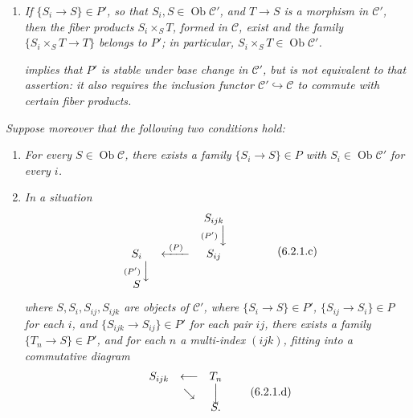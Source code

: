 \begin{enumerate}
  \item[(a)] \textit{If \(\{S_i\to S\}\in P'\), so that
    \(S_i,S\in\operatorname{Ob}\mathscr C'\), and \(T\to S\) is a
    morphism in \(\mathscr C'\), then the fiber products
    \(S_i\times_ST\), formed in \(\mathscr C\), exist and the family
    \(\{S_i\times_ST\to T\}\) belongs to \(P'\); in particular,
    \(S_i\times_ST\in\operatorname{Ob}\mathscr C'\).}

    \textit{ implies that \(P'\) is stable under base change
    in \(\mathscr C'\), but is not equivalent to that assertion: it also
    requires the inclusion functor \(\mathscr C'\hookrightarrow\mathscr C\)
    to commute with certain fiber products.}
\end{enumerate}

\textit{Suppose moreover that the following two conditions hold:}

\begin{enumerate}
  \item[(b)] \textit{For every \(S\in\operatorname{Ob}\mathscr C\), there
    exists a family \(\{S_i\to S\}\in P\) with
    \(S_i\in\operatorname{Ob}\mathscr C'\) for every \(i\).}

  \item[(c)] \textit{In a situation}
    \[
    \begin{array}{ccccc}
      & & S_{ijk} & &\\
      & & \scriptstyle(P')\,\Big\downarrow & &\\[-0.25em]
      S_i & \xleftarrow{\ (P)\ } & S_{ij} & &\\
      \scriptstyle(P')\,\Big\downarrow & & & &\\[-0.25em]
      S & & & &
    \end{array}
    \tag{6.2.1.c}\label{sga3:iv:proposition:6:2:1:eq:6:2:1:c:01}
    \]
    \textit{where \(S,S_i,S_{ij},S_{ijk}\) are objects of
    \(\mathscr C'\), where \(\{S_i\to S\}\in P'\),
    \(\{S_{ij}\to S_i\}\in P\) for each \(i\), and
    \(\{S_{ijk}\to S_{ij}\}\in P'\) for each pair \(ij\), there exists a
    family \(\{T_n\to S\}\in P'\), and for each \(n\) a multi-index
    \((ijk)\), fitting into a commutative diagram}
    \[
    \begin{array}{ccccc}
      S_{ijk} & \longleftarrow & T_n\\
      & \searrow & \Big\downarrow\\[-0.25em]
      & & S .
    \end{array}
    \tag{6.2.1.d}\label{sga3:iv:proposition:6:2:1:eq:6:2:1:d:01}
    \]
\end{enumerate}

